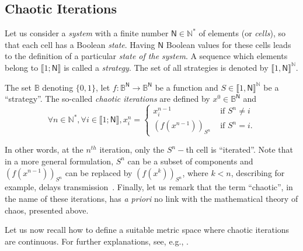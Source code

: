 \documentclass{article}
\begin{document}
\subsection{Chaotic Iterations}
\label{sec:chaotic iterations}


Let us consider  a \emph{system} with a finite  number $\mathsf{N} \in
\mathds{N}^*$ of elements  (or \emph{cells}), so that each  cell has a
Boolean  \emph{state}. Having $\mathsf{N}$ Boolean values for these
 cells  leads to the definition of a particular \emph{state  of the
system}. A sequence which  elements belong to $\llbracket 1;\mathsf{N}
\rrbracket $ is called a \emph{strategy}. The set of all strategies is
denoted by $\llbracket 1, \mathsf{N} \rrbracket^\mathds{N}.$

\begin{definition}
\label{Def:chaotic iterations}
The      set       $\mathds{B}$      denoting      $\{0,1\}$,      let
$f:\mathds{B}^{\mathsf{N}}\longrightarrow  \mathds{B}^{\mathsf{N}}$ be
a  function  and  $S\in  \llbracket 1, \mathsf{N} \rrbracket^\mathds{N}$  be  a  ``strategy''.  The  so-called
\emph{chaotic      iterations}     are     defined      by     $x^0\in
\mathds{B}^{\mathsf{N}}$ and
\begin{equation}
\forall    n\in     \mathds{N}^{\ast     },    \forall     i\in
\llbracket1;\mathsf{N}\rrbracket ,x_i^n=\left\{
\begin{array}{ll}
  x_i^{n-1} &  \text{ if  }S^n\neq i \\
  \left(f(x^{n-1})\right)_{S^n} & \text{ if }S^n=i.
\end{array}\right.
\end{equation}
\end{definition}

In other words, at the $n^{th}$ iteration, only the $S^{n}-$th cell is
\textquotedblleft  iterated\textquotedblright .  Note  that in  a more
general  formulation,  $S^n$  can   be  a  subset  of  components  and
$\left(f(x^{n-1})\right)_{S^{n}}$      can     be      replaced     by
$\left(f(x^{k})\right)_{S^{n}}$, where  $k<n$, describing for example,
delays  transmission~\cite{Robert1986,guyeux10}.  Finally,  let us  remark that
the term  ``chaotic'', in  the name of  these iterations,  has \emph{a
priori} no link with the mathematical theory of chaos, presented above.


Let us now recall how to define a suitable metric space where chaotic iterations
are continuous. For further explanations, see, e.g., \cite{guyeux10}.
\end{document}
